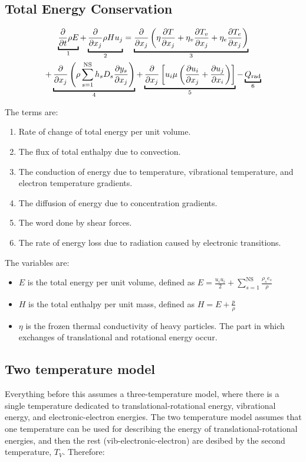 \documentclass[10pt]{article}
\begin{document}
\begin{flushleft}
\subsection{Total Energy Conservation}

\begin{multline}
    \ub{\pd{}{t} \rho E}{1} + \ub{\pd{}{x_j} \rho H u_j}{2} = \ub{\pd{}{x_j} \bp{\eta \pd{T}{x_j} + \eta_v \pd{T_v}{x_j} + \eta_e \pd{T_e}{x_j}}}{3} \\ + \ub{\pd{}{x_j} \bp{\rho \sum_{s=1}^\text{NS} h_s D_s \pd{y_s}{x_j}}}{4} + \ub{\pd{}{x_j} \bb{u_i \mu \bp{\pd{u_i}{x_j} + \pd{u_j}{x_i}}}}{5} - \ub{Q_\text{rad}}{6}
\end{multline}

The terms are:

\begin{enumerate}
    \item Rate of change of total energy per unit volume.
    \item The flux of total enthalpy due to convection.
    \item The conduction of energy due to temperature, vibrational temperature, and electron temperature gradients.
    \item The diffusion of energy due to concentration gradients.
    \item The word done by shear forces.
    \item The rate of energy loss due to radiation caused by electronic transitions.
\end{enumerate}

The variables are:

\begin{itemize}
    \item $E$ is the total energy per unit volume, defined as $\displaystyle E = \frac{u_i u_i}{2} + \sum_{s=1}^\text{NS} \frac{\rho_s e_s}{\rho}$
    \item $H$ is the total enthalpy per unit mass, defined as $\displaystyle H = E + \frac{p}{\rho}$
    \item $\eta$ is the frozen thermal conductivity of heavy particles. The part in which exchanges of translational and rotational energy occur.
\end{itemize}

\subsection{Two temperature model}

Everything before this assumes a three-temperature model, where there is a single temperature dedicated to translational-rotational energy, vibrational energy, and electronic-electron energies. The two temperature model assumes that one temperature can be used for describing the energy of translational-rotational energies, and then the rest (vib-electronic-electron) are desibed by the second temperature, $T_V$. Therefore:


\end{flushleft}
\end{document}
